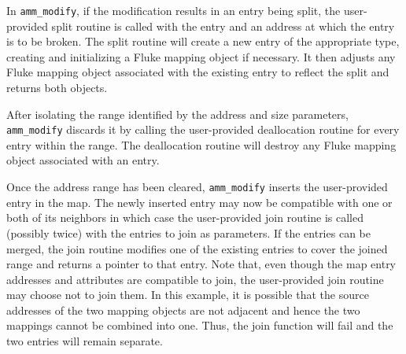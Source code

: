 In {\tt amm_modify},
if the modification results in an entry being split,
the user-provided split routine is called with the entry and an address
at which the entry is to be broken.
The split routine will create a new entry of the appropriate type,
creating and initializing a Fluke mapping object if necessary.
It then adjusts any Fluke mapping object associated with the existing entry
to reflect the split and returns both objects.

After isolating the range identified by the address and size parameters,
{\tt amm_modify} discards it by calling the user-provided deallocation routine
for every entry within the range.
The deallocation routine will destroy any Fluke mapping object associated
with an entry.

Once the address range has been cleared,
{\tt amm_modify} inserts the user-provided entry in the map.
The newly inserted entry may now be compatible with one or both of its
neighbors in which case the user-provided join routine is called (possibly
twice) with the entries to join as parameters.
If the entries can be merged,
the join routine modifies one of the existing entries to cover the joined
range and returns a pointer to that entry.
Note that, even though the map entry addresses and attributes are compatible
to join, the user-provided join routine may choose not to join them.
In this example, it is possible that the source addresses of the two mapping
objects are not adjacent and hence the two mappings cannot be combined into
one.
Thus, the join function will fail and the two entries will remain separate.

